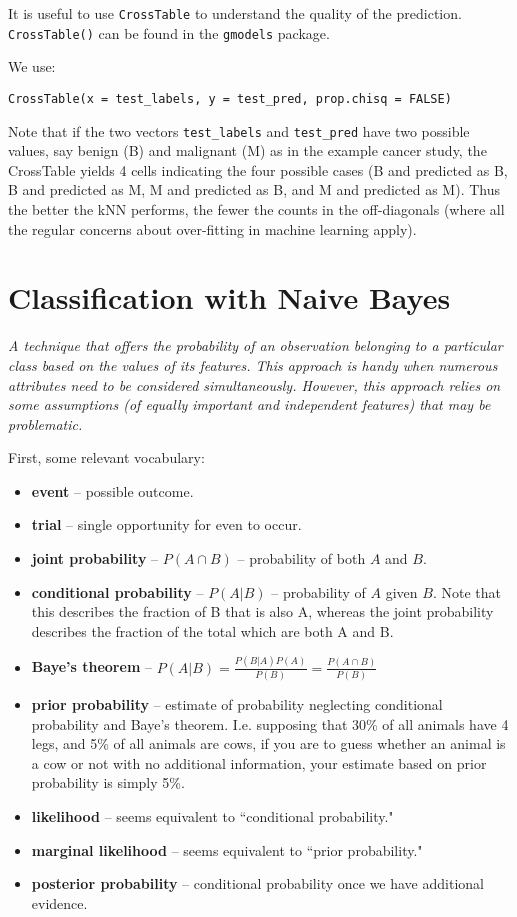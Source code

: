 \documentclass[]{article}
\begin{document}
It is useful to use \verb|CrossTable| to understand the quality of the prediction.  \verb|CrossTable()| can be found in the \verb|gmodels| package.

We use: 
\begin{verbatim}
CrossTable(x = test_labels, y = test_pred, prop.chisq = FALSE)
\end{verbatim}
Note that if the two vectors \verb|test_labels| and \verb|test_pred| have two possible values, say benign (B) and malignant (M) as in the example cancer study, the CrossTable yields 4 cells indicating the four possible cases (B and predicted as B, B and predicted as M, M and predicted as B, and M and predicted as M).  Thus the better the kNN performs, the fewer the counts in the off-diagonals (where all the regular concerns about over-fitting in machine learning apply).  

\section{Classification with Naive Bayes}

\emph{A technique that offers the probability of an observation belonging to a particular class based on the values of its features.  This approach is handy when numerous attributes need to be considered simultaneously.  However, this approach relies on some assumptions (of equally important and independent features) that may be problematic.}

First, some relevant vocabulary:
\begin{itemize}
\item \textbf{event} -- possible outcome.
\item \textbf{trial} -- single opportunity for even to occur.
\item \textbf{joint probability} -- $P(A \cap B)$ -- probability of both $A$ and $B$.
\item \textbf{conditional probability} -- $P(A|B)$ -- probability of $A$ given $B$.  Note that this describes the fraction of B that is also A, whereas the joint probability describes the fraction of the total which are both A and B.
\item \textbf{Baye's theorem} -- $P(A|B) = \frac{P(B|A)P(A)}{P(B)} = \frac{P(A \cap B)}{P(B)}$
\item \textbf{prior probability} -- estimate of probability neglecting conditional probability and Baye's theorem.  I.e. supposing that 30\% of all animals have 4 legs, and 5\% of all animals are cows, if you are to guess whether an animal is a cow or not with no additional information, your estimate based on prior probability is simply 5\%.
\item \textbf{likelihood} -- seems equivalent to ``conditional probability."
\item \textbf{marginal likelihood} -- seems equivalent to ``prior probability."
\item \textbf{posterior probability} -- conditional probability once we have additional evidence.
\end{itemize}
\end{document}

